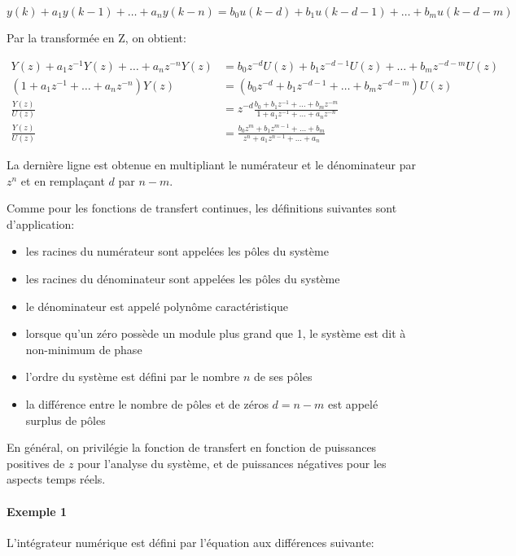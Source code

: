 \documentclass[11pt]{article}
\providecommand{\tightlist}{%
      \setlength{\itemsep}{0pt}\setlength{\parskip}{0pt}}
\begin{document}
\[ y(k) + a_1 y(k-1) + \dots + a_n y(k-n) = b_0 u(k-d) + b_1 u(k-d-1) + \dots + b_m u(k-d-m) \]

Par la transformée en Z, on obtient:

\begin{align}
Y(z) + a_1 z^{-1}Y(z) + \dots + a_n z^{-n}Y(z) &= b_0 z^{-d}U(z) + b_1 z^{-d-1}U(z) + \dots + b_m z^{-d-m}U(z) \\
\left(1 + a_1 z^{-1} + \dots + a_n z^{-n}\right)Y(z) &= \left(b_0 z^{-d} + b_1 z^{-d-1} + \dots + b_m z^{-d-m}\right)U(z) \\
\frac{Y(z)}{U(z)} &= z^{-d}\frac{b_0+b_1z^{-1}+\dots+b_mz^{-m}}{1+a_1z^{-1}+\dots+a_nz^{-n}} \\
\frac{Y(z)}{U(z)} &= \frac{b_0z^m+b_1z^{m-1}+\dots+b_m}{z^n+a_1z^{n-1}+\dots+a_n}
\end{align}

La dernière ligne est obtenue en multipliant le numérateur et le
dénominateur par \(z^n\) et en remplaçant \(d\) par \(n-m\).

    Comme pour les fonctions de transfert continues, les définitions
suivantes sont d'application:

\begin{itemize}
\tightlist
\item
  les racines du numérateur sont appelées les pôles du système
\item
  les racines du dénominateur sont appelées les pôles du système
\item
  le dénominateur est appelé polynôme caractéristique
\item
  lorsque qu'un zéro possède un module plus grand que 1, le système est
  dit à non-minimum de phase
\item
  l'ordre du système est défini par le nombre \(n\) de ses pôles
\item
  la différence entre le nombre de pôles et de zéros \(d = n - m\) est
  appelé surplus de pôles
\end{itemize}

    En général, on privilégie la fonction de transfert en fonction de
puissances positives de \(z\) pour l'analyse du système, et de
puissances négatives pour les aspects temps réels.

    \paragraph{Exemple 1}\label{exemple-1}

L'intégrateur numérique est défini par l'équation aux différences
suivante:
\end{document}

